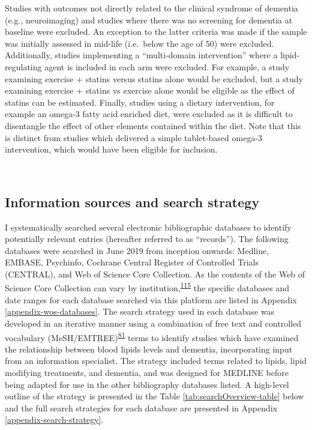\documentclass[a4paper, twoside]{templates/ociamthesis}
\begin{document}
Studies with outcomes not directly related to the clinical syndrome of dementia (e.g., neuroimaging) and studies where there was no screening for dementia at baseline were excluded. An exception to the latter criteria was made if the sample was initially assessed in mid-life (i.e.~below the age of 50) were excluded. Additionally, studies implementing a ``multi-domain intervention'' where a lipid-regulating agent is included in each arm were excluded. For example, a study examining exercise + statins versus statins alone would be excluded, but a study examining exercise + statins vs exercise alone would be eligible as the effect of statins can be estimated. Finally, studies using a dietary intervention, for example an omega-3 fatty acid enriched diet, were excluded as it is difficult to disentangle the effect of other elements contained within the diet. Note that this is distinct from studies which delivered a simple tablet-based omega-3 intervention, which would have been eligible for inclusion.

~

\hypertarget{information-sources-and-search-strategy}{%
\subsection{Information sources and search strategy}\label{information-sources-and-search-strategy}}

I systematically searched several electronic bibliographic databases to identify potentially relevant entries (hereafter referred to as ``records''). The following databases were searched in June 2019 from inception onwards: Medline, EMBASE, Psychinfo, Cochrane Central Register of Controlled Trials (CENTRAL), and Web of Science Core Collection. As the contents of the Web of Science Core Collection can vary by institution,\textsuperscript{\protect\hyperlink{ref-gusenbauer2020}{115}} the specific databases and date ranges for each database searched via this platform are listed in Appendix \ref{appendix-wos-databases}. The search strategy used in each database was developed in an iterative manner using a combination of free text and controlled vocabulary (MeSH/EMTREE)\textsuperscript{\protect\hyperlink{ref-lefebvre2019searching}{81}} terms to identify studies which have examined the relationship between blood lipids levels and dementia, incorporating input from an information specialist. The strategy included terms related to lipids, lipid modifying treatments, and dementia, and was designed for MEDLINE before being adapted for use in the other bibliography databases listed. A high-level outline of the strategy is presented in the Table \ref{tab:searchOverview-table} below and the full search strategies for each database are presented in Appendix \ref{appendix-search-strategy}.
\end{document}
